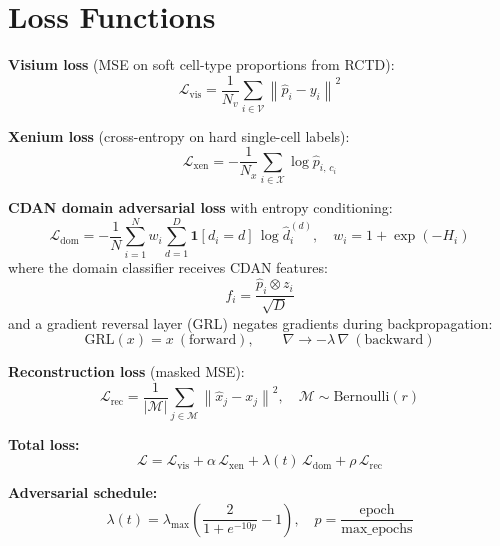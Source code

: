 \documentclass[11pt]{article}
\newcommand{\loss}{\mathcal{L}}
\begin{document}
\section*{Loss Functions}

\textbf{Visium loss} (MSE on soft cell-type proportions from RCTD):
\begin{equation}
\loss_{\text{vis}} = \frac{1}{N_v} \sum_{i \in \mathcal{V}} \left\| \hat{p}_i - y_i \right\|^2
\end{equation}

\textbf{Xenium loss} (cross-entropy on hard single-cell labels):
\begin{equation}
\loss_{\text{xen}} = -\frac{1}{N_x} \sum_{i \in \mathcal{X}} \log \hat{p}_{i,\, c_i}
\end{equation}

\textbf{CDAN domain adversarial loss} with entropy conditioning:
\begin{equation}
\loss_{\text{dom}} = -\frac{1}{N} \sum_{i=1}^{N} w_i \sum_{d=1}^{D} \mathbf{1}[d_i = d]\, \log \hat{d}_i^{(d)}, \quad w_i = 1 + \exp(-H_i)
\end{equation}
where the domain classifier receives CDAN features:
\begin{equation}
f_i = \frac{\hat{p}_i \otimes z_i}{\sqrt{D}}
\end{equation}
and a gradient reversal layer (GRL) negates gradients during backpropagation:
\begin{equation}
\text{GRL}(x) = x \ (\text{forward}), \qquad \nabla \rightarrow -\lambda\, \nabla \ (\text{backward})
\end{equation}

\textbf{Reconstruction loss} (masked MSE):
\begin{equation}
\loss_{\text{rec}} = \frac{1}{|\mathcal{M}|} \sum_{j \in \mathcal{M}} \left\| \hat{x}_j - x_j \right\|^2, \quad \mathcal{M} \sim \text{Bernoulli}(r)
\end{equation}

\textbf{Total loss:}
\begin{equation}
\loss = \loss_{\text{vis}} + \alpha\, \loss_{\text{xen}} + \lambda(t)\, \loss_{\text{dom}} + \rho\, \loss_{\text{rec}}
\end{equation}

\textbf{Adversarial schedule:}
\begin{equation}
\lambda(t) = \lambda_{\max} \left( \frac{2}{1 + e^{-10p}} - 1 \right), \quad p = \frac{\text{epoch}}{\text{max\_epochs}}
\end{equation}
\end{document}
